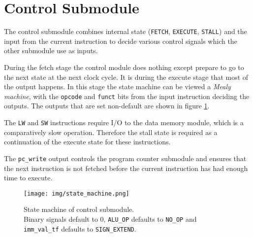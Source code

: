 \section{Control Submodule}
The control submodule combines internal state (\texttt{FETCH}, \texttt{EXECUTE}, \texttt{STALL}) and the input from the current instruction to decide various control signals which the other submodule use as inputs.

During the fetch stage the control module does nothing except prepare to go to the next state at the next clock cycle.
It is during the execute stage that most of the output happens.
In this stage the state machine can be viewed a \textit{Mealy machine},
with the \texttt{opcode} and \texttt{funct} bits from the input instruction deciding the outputs.
The outputs that are set non-default are shown in figure \ref{fig:state_machine}.

The \texttt{LW} and \texttt{SW} instructions require I/O to the data memory module,
which is a comparatively slow operation.
Therefore the stall state is required as a continuation of the execute state for these instructions.

The \texttt{pc\_write} output controls the program counter submodule and ensures that the next instruction is not fetched before the current instruction has had enough time to execute.

\begin{figure}[p]
    \centering
    \texttt{[image: img/state\_machine.png]}
    \caption{State machine of control submodule.\\Binary signals default to 0, \texttt{ALU\_OP} defaults to \texttt{NO\_OP} and \texttt{imm\_val\_tf} defaults to \texttt{SIGN\_EXTEND}.}
    \label{fig:state_machine}
\end{figure}

